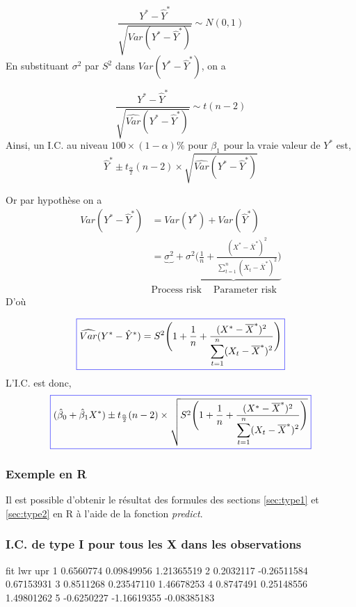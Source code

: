 \documentclass[11pt,french]{report}
\begin{document}
$$
\frac{Y^* - \hat{Y}^*}{\sqrt{Var(Y^* - \hat{Y}^*)}} \sim N(0,1)
$$
En substituant $\sigma^2$ par $S^2$ dans $Var(Y^* - \hat{Y}^*)$, on a

$$
\frac{Y^* - \hat{Y}^*}{\sqrt{\widehat{Var}(Y^* - \hat{Y}^*)}} \sim t(n-2)
$$
Ainsi, un I.C. au niveau $100 \times (1 - \alpha)\%$ pour $\beta_1$  pour la vraie valeur de $Y^*$ est,
$$
\hat{Y}^* \pm t_{\frac{\alpha}{2}}(n-2)\times \sqrt{\widehat{Var}(Y^* - \hat{Y}^*)}
$$

Or par hypothèse on a
\begin{align*}
Var(Y^* - \hat{Y}^*) &= Var(Y^*) + Var(\hat{Y}^*) \\
&= \underbrace{\sigma^2} +\underbrace{\sigma^2\Bigg( \frac{1}{n} + \frac{(X^* - \overline{X}^*)^2}{\displaystyle\sum_{t=1}^n (X_t - \overline{X}^*)^2}\Bigg)}  \\
&   \text{Process risk }\ \ \ \  \text{Parameter risk}
\end{align*}
D'où 

\begin{equation}
\label{eq:var2*}
\color{blue}
\boxed{\color{black}
\widehat{Var}(Y^* - \hat{Y}^*) = S^2 \Bigg(1 + \frac{1}{n} + \frac{(X^* - \overline{X}^*)^2}{\displaystyle\sum_{t=1}^n (X_t - \overline{X}^*)^2}\Bigg)  
}
\end{equation}
L'I.C. est donc,
\begin{equation}
\label{eq:IC3}
\color{blue}
\boxed{\color{black}
(\hat{\beta}_0 + \hat{\beta}_1X^*) \pm t_{\frac{\alpha}{2}}(n-2)\times \sqrt{S^2 \Bigg(1 + \frac{1}{n} + \frac{(X^* - \overline{X}^*)^2}{\displaystyle\sum_{t=1}^n (X_t - \overline{X}^*)^2}\Bigg)}  
}
\end{equation}

\subsubsection*{Exemple en R}
Il est possible d'obtenir le résultat des formules des sections \ref{sec:type1} et \ref{sec:type2} en R à l'aide de la fonction \emph{predict}.

\subsubsection*{I.C. de type I pour tous les X dans les observations}
\begin{Schunk}
\begin{Soutput}
         fit         lwr         upr
1  0.6560774  0.09849956  1.21365519
2  0.2032117 -0.26511584  0.67153931
3  0.8511268  0.23547110  1.46678253
4  0.8747491  0.25148556  1.49801262
5 -0.6250227 -1.16619355 -0.08385183
\end{Soutput}
\end{Schunk}
\end{document}
